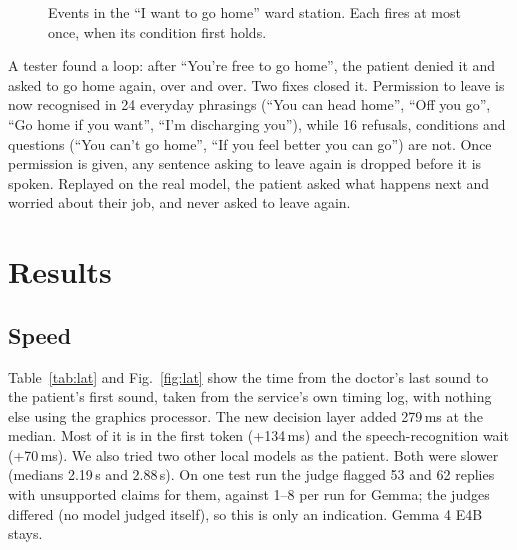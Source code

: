 \documentclass[journal]{IEEEtran}
\begin{document}
\begin{figure}[t]
\centering
{}
\caption{Events in the ``I want to go home'' ward station. Each fires at most once, when its condition first holds.}
\label{fig:events}
\end{figure}

A tester found a loop: after ``You're free to go home'', the patient denied it and asked to go home again, over and over. Two fixes closed it.
Permission to leave is now recognised in 24 everyday phrasings (``You can head home'', ``Off you go'', ``Go home if you want'', ``I'm discharging
you''), while 16 refusals, conditions and questions (``You can't go home'', ``If you feel better you can go'') are not. Once permission is given,
any sentence asking to leave again is dropped before it is spoken. Replayed on the real model, the patient asked what happens next and worried
about their job, and never asked to leave again.

\section{Results}

\subsection{Speed}
Table~\ref{tab:lat} and Fig.~\ref{fig:lat} show the time from the doctor's last sound to the patient's first sound, taken from the service's own
timing log, with nothing else using the graphics processor. The new decision layer added 279\,ms at the median. Most of it is in the first token
(+134\,ms) and the speech-recognition wait (+70\,ms). We also tried two other local models as the patient. Both were slower (medians 2.19\,s and
2.88\,s). On one test run the judge flagged 53 and 62 replies with unsupported claims for them, against 1--8 per run for Gemma; the judges differed
(no model judged itself), so this is only an indication. Gemma 4 E4B stays.
\end{document}
